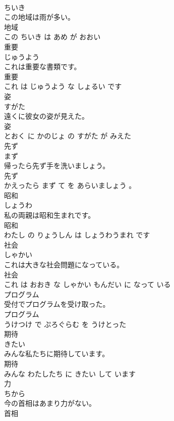 \documentclass[8pt]{extreport}
\begin{document}
\begin{CJK}{UTF8}{min}
\\	ちいき			
\\	この地域は雨が多い。	
\\	地域 
\\	この ちいき は あめ が おおい			
\\	重要	
\\	じゅうよう			
\\	これは重要な書類です。	
\\	重要 
\\	これ は じゅうよう な しょるい です			
\\	姿	
\\	すがた			
\\	遠くに彼女の姿が見えた。	
\\	姿 
\\	とおく に かのじょ の すがた が みえた			
\\	先ず	
\\	まず			
\\	帰ったら先ず手を洗いましょう。	
\\	先ず 
\\	かえったら まず て を あらいましょう 。			
\\	昭和	
\\	しょうわ			
\\	私の両親は昭和生まれです。	
\\	昭和 
\\	わたし の りょうしん は しょうわうまれ です			
\\	社会	
\\	しゃかい			
\\	これは大きな社会問題になっている。	
\\	社会 
\\	これ は おおき な しゃかい もんだい に なって いる			
\\	プログラム	
\\	受付でプログラムを受け取った。	
\\	プログラム 
\\	うけつけ で ぷろぐらむ を うけとった			
\\	期待	
\\	きたい			
\\	みんな私たちに期待しています。	
\\	期待 
\\	みんな わたしたち に きたい して います			
\\	力	
\\	ちから			
\\	今の首相はあまり力がない。	
\\	首相 

\end{CJK}
\end{document}
